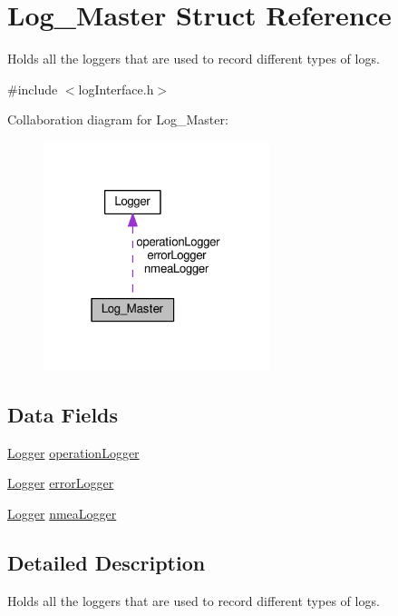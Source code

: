 \hypertarget{struct_log___master}{}\section{Log\+\_\+\+Master Struct Reference}
\label{struct_log___master}


Holds all the loggers that are used to record different types of logs.  




{\ttfamily \#include $<$log\+Interface.\+h$>$}



Collaboration diagram for Log\+\_\+\+Master\+:\nopagebreak
\begin{figure}[H]
\begin{center}
\leavevmode
\includegraphics[width=187pt]{struct_log___master__coll__graph}
\end{center}
\end{figure}
\subsection*{Data Fields}
\begin{DoxyCompactItemize}
\item 
\hyperlink{struct_logger}{Logger} \hyperlink{struct_log___master_a86b17527dd6375131f69c50edcaa0d00}{operation\+Logger}
\item 
\hyperlink{struct_logger}{Logger} \hyperlink{struct_log___master_ad2f23f105d708487d58a08cfc0492d4a}{error\+Logger}
\item 
\hyperlink{struct_logger}{Logger} \hyperlink{struct_log___master_a39b31051fe482d807aba1796b4b0591c}{nmea\+Logger}
\end{DoxyCompactItemize}


\subsection{Detailed Description}
Holds all the loggers that are used to record different types of logs. 


